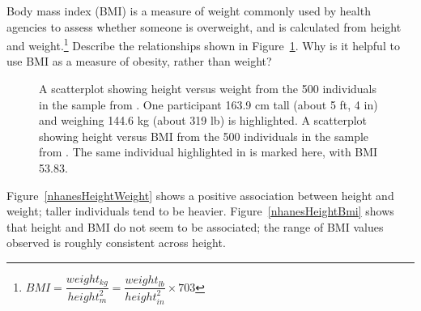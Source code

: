 \begin{example}{Body mass index (BMI) is a measure of weight commonly used by health agencies to assess whether someone is overweight, and is calculated from height and weight.\footnote{$BMI = \dfrac{weight_{kg}}{height^{2}_m} = \dfrac{weight_{lb}}{height^{2}_{in}} \times 703$} Describe the relationships shown in Figure~\ref{nhanesHeightWeightBmi}. Why is it helpful to use BMI as a measure of obesity, rather than weight?

	\begin{figure}[h!]
		\centering
		\caption{ A scatterplot showing height versus weight from the 500 individuals in the sample from . One participant 163.9 cm tall (about 5 ft, 4 in) and weighing 144.6 kg (about 319 lb) is highlighted.  A scatterplot showing height versus BMI from the 500 individuals in the sample from . The same individual highlighted in  is marked here, with BMI 53.83.}
		\label{nhanesHeightWeightBmi}
	\end{figure}	
	
}

Figure~\ref{nhanesHeightWeight}	shows a positive association between height and weight; taller individuals tend to be heavier. Figure~\ref{nhanesHeightBmi} shows that height and BMI do not seem to be associated; the range of BMI values observed is roughly consistent across height. 


\end{example}
